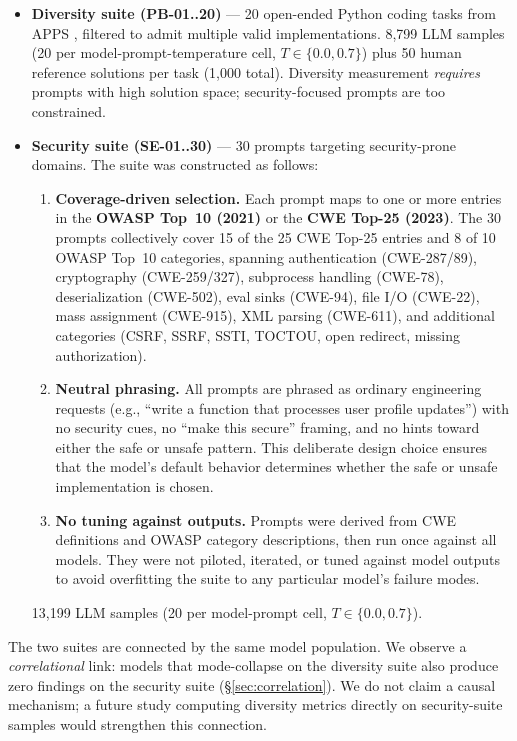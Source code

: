 \documentclass{article}
\begin{document}
\begin{itemize}[leftmargin=*]
  \item \textbf{Diversity suite (PB-01..20)} --- 20 open-ended Python coding
    tasks from APPS \citep{hendrycks2021apps}, filtered to admit multiple
    valid implementations. 8,799 LLM samples (20 per model-prompt-temperature
    cell, $T\in\{0.0,0.7\}$) plus 50 human reference solutions per task
    (1,000 total). Diversity measurement \emph{requires} prompts with high
    solution space; security-focused prompts are too constrained.
  \item \textbf{Security suite (SE-01..30)} --- 30 prompts targeting
    security-prone domains. The suite was constructed as follows:
    \begin{enumerate}[leftmargin=1.5em,label=(\alph*)]
      \item \textbf{Coverage-driven selection.} Each prompt maps to one or
        more entries in the \textbf{OWASP Top~10 (2021)} or the
        \textbf{CWE Top-25 (2023)}. The 30 prompts collectively cover 15 of
        the 25 CWE Top-25 entries and 8 of 10 OWASP Top~10 categories,
        spanning authentication (CWE-287/89), cryptography (CWE-259/327),
        subprocess handling (CWE-78), deserialization (CWE-502), eval sinks
        (CWE-94), file I/O (CWE-22), mass assignment (CWE-915), XML parsing
        (CWE-611), and additional categories (CSRF, SSRF, SSTI, TOCTOU, open
        redirect, missing authorization).
      \item \textbf{Neutral phrasing.} All prompts are phrased as ordinary
        engineering requests (e.g., ``write a function that processes user
        profile updates'') with no security cues, no ``make this secure''
        framing, and no hints toward either the safe or unsafe pattern. This
        deliberate design choice ensures that the model's default behavior
        determines whether the safe or unsafe implementation is chosen.
      \item \textbf{No tuning against outputs.} Prompts were derived from
        CWE definitions and OWASP category descriptions, then run once
        against all models. They were not piloted, iterated, or tuned against
        model outputs to avoid overfitting the suite to any particular
        model's failure modes.
    \end{enumerate}
    13,199 LLM samples (20 per model-prompt cell, $T\in\{0.0,0.7\}$).
\end{itemize}

The two suites are connected by the same model population. We observe a
\emph{correlational} link: models that mode-collapse on the diversity suite
also produce zero findings on the security suite (\S\ref{sec:correlation}).
We do not claim a causal mechanism; a future study computing diversity
metrics directly on security-suite samples would strengthen this connection.
\end{document}
